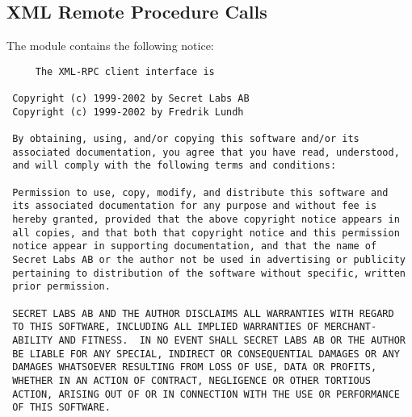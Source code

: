 \subsection{XML Remote Procedure Calls}

The  module contains the following notice:

\begin{verbatim}
     The XML-RPC client interface is

 Copyright (c) 1999-2002 by Secret Labs AB
 Copyright (c) 1999-2002 by Fredrik Lundh

 By obtaining, using, and/or copying this software and/or its
 associated documentation, you agree that you have read, understood,
 and will comply with the following terms and conditions:

 Permission to use, copy, modify, and distribute this software and
 its associated documentation for any purpose and without fee is
 hereby granted, provided that the above copyright notice appears in
 all copies, and that both that copyright notice and this permission
 notice appear in supporting documentation, and that the name of
 Secret Labs AB or the author not be used in advertising or publicity
 pertaining to distribution of the software without specific, written
 prior permission.

 SECRET LABS AB AND THE AUTHOR DISCLAIMS ALL WARRANTIES WITH REGARD
 TO THIS SOFTWARE, INCLUDING ALL IMPLIED WARRANTIES OF MERCHANT-
 ABILITY AND FITNESS.  IN NO EVENT SHALL SECRET LABS AB OR THE AUTHOR
 BE LIABLE FOR ANY SPECIAL, INDIRECT OR CONSEQUENTIAL DAMAGES OR ANY
 DAMAGES WHATSOEVER RESULTING FROM LOSS OF USE, DATA OR PROFITS,
 WHETHER IN AN ACTION OF CONTRACT, NEGLIGENCE OR OTHER TORTIOUS
 ACTION, ARISING OUT OF OR IN CONNECTION WITH THE USE OR PERFORMANCE
 OF THIS SOFTWARE.
\end{verbatim}
